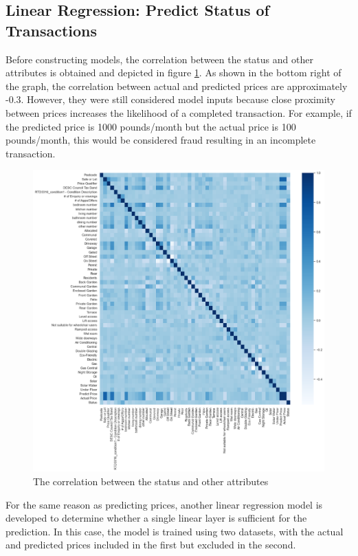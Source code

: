 \documentclass[12pt,twoside]{report}
\begin{document}
\subsection{Linear Regression: Predict Status of Transactions}
Before constructing models, the correlation between the status and other attributes is obtained and depicted in figure \ref{correlation_status}. As shown in the bottom right of the graph, the correlation between actual and predicted prices are approximately -0.3. However, they were still considered model inputs because close proximity between prices increases the likelihood of a completed transaction. For example, if the predicted price is 1000 pounds/month but the actual price is 100 pounds/month, this would be considered fraud resulting in an incomplete transaction. 

\begin{figure}[!htbp]
	\centering
	\includegraphics[width=15cm]{correlation_status}
	\caption{The correlation between the status and other attributes}
	\label{correlation_status}
\end{figure}

For the same reason as predicting prices, another linear regression model is developed to determine whether a single linear layer is sufficient for the prediction. In this case, the model is trained using two datasets, with the actual and predicted prices included in the first but excluded in the second. 
\end{document}
